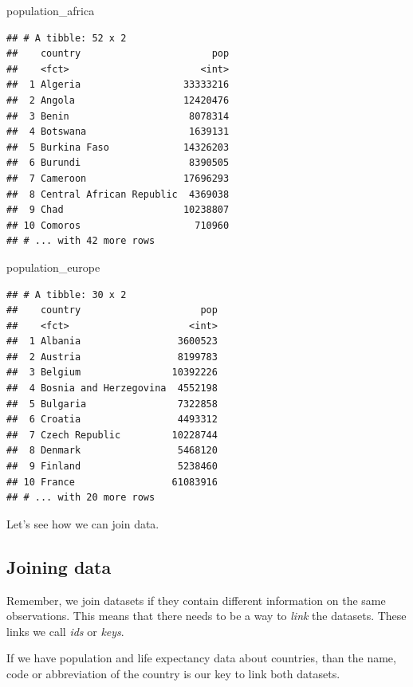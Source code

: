 \documentclass[]{tufte-book}
\newenvironment{Shaded}{}{}
\newcommand{\NormalTok}[1]{#1}
\begin{document}
\begin{Shaded}
\begin{Highlighting}[]
\NormalTok{population_africa}
\end{Highlighting}
\end{Shaded}

\begin{verbatim}
## # A tibble: 52 x 2
##    country                       pop
##    <fct>                       <int>
##  1 Algeria                  33333216
##  2 Angola                   12420476
##  3 Benin                     8078314
##  4 Botswana                  1639131
##  5 Burkina Faso             14326203
##  6 Burundi                   8390505
##  7 Cameroon                 17696293
##  8 Central African Republic  4369038
##  9 Chad                     10238807
## 10 Comoros                    710960
## # ... with 42 more rows
\end{verbatim}

\begin{Shaded}
\begin{Highlighting}[]
\NormalTok{population_europe}
\end{Highlighting}
\end{Shaded}

\begin{verbatim}
## # A tibble: 30 x 2
##    country                     pop
##    <fct>                     <int>
##  1 Albania                 3600523
##  2 Austria                 8199783
##  3 Belgium                10392226
##  4 Bosnia and Herzegovina  4552198
##  5 Bulgaria                7322858
##  6 Croatia                 4493312
##  7 Czech Republic         10228744
##  8 Denmark                 5468120
##  9 Finland                 5238460
## 10 France                 61083916
## # ... with 20 more rows
\end{verbatim}

Let's see how we can join data.

\hypertarget{joining-data}{%
\subsection{Joining data}\label{joining-data}}

Remember, we join datasets if they contain different information on the same observations. This means that there needs to be a way to \emph{link} the datasets. These links we call \emph{ids} or \emph{keys}.

If we have population and life expectancy data about countries, than the name, code or abbreviation of the country is our key to link both datasets.
\end{document}
